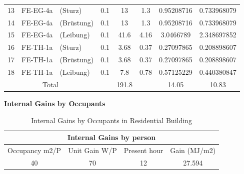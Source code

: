 \documentclass[11pt, a4paper]{article}
\theoremstyle{definition}
\begin{document}
\begin{table}[H]
\begin{tabular}{ccrccccc}
		    13   & \multicolumn{1}{r}{FE-EG-4a} & \multicolumn{1}{l}{(Sturz)} & 0.1  & 13   & 1.3  & 0.95208716 & 0.733968079 \\
		    14   & \multicolumn{1}{r}{FE-EG-4a} & \multicolumn{1}{l}{(Brüstung)} & 0.1  & 13   & 1.3  & 0.95208716 & 0.733968079 \\
		    15   & \multicolumn{1}{r}{FE-EG-4a} & \multicolumn{1}{l}{(Leibung)} & 0.1  & 41.6 & 4.16 & 3.0466789 & 2.348697852 \\
		    16   & \multicolumn{1}{r}{FE-TH-1a} & \multicolumn{1}{l}{(Sturz)} & 0.1  & 3.68 & 0.37 & 0.27097865 & 0.208898607 \\
		    17   & \multicolumn{1}{r}{FE-TH-1a} & \multicolumn{1}{l}{(Brüstung)} & 0.1  & 3.68 & 0.37 & 0.27097865 & 0.208898607 \\
		    18   & \multicolumn{1}{r}{FE-TH-1a} & \multicolumn{1}{l}{(Leibung)} & 0.1  & 7.8  & 0.78 & 0.57125229 & 0.440380847 \\
		    \midrule
		    \multicolumn{3}{c}{Total} &     & 191.8 &            & 14.05 & 10.83 \\
		    \bottomrule
		    \end{tabular}%
		  \label{tab:HonggerThermalBridge}%
		\end{table}%

		\textbf{Internal Gains by Occupants}\\ 
		\begin{table}[htbp]
		\centering
		\caption{Internal Gains by Occupants in Residential Building}
		    \begin{tabular}{cccc}
		    \toprule
		    \multicolumn{4}{c}{Internal Gains by person} \\
		    \midrule
		    \multicolumn{1}{p{8.07em}}{Occupancy m2/P} & \multicolumn{1}{p{7em}}{Unit Gain W/P} & \multicolumn{1}{p{7.355em}}{Present hour } & \multicolumn{1}{p{7.355em}}{Gain (MJ/m2)} \\
		    40    & 70    & 12    & 27.594 \\
		    \bottomrule
		    \end{tabular}%
		  \label{tab:HonggOccupancyGain}%
		\end{table}%
\end{document}
